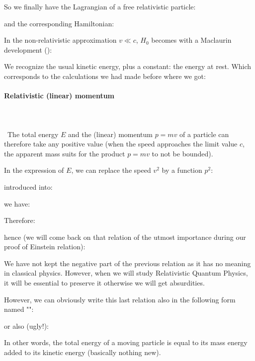 	So we finally have the Lagrangian of a free relativistic particle\label{lagrangian free relativistic particle}:
	
	and the corresponding Hamiltonian:
	
	In the non-relativistic approximation $v\ll c$, $H_0$ becomes with a Maclaurin development ():
	
	We recognize the usual kinetic energy, plus a constant: the energy at rest. Which corresponds to the calculations we had made before where we got:
	

	\paragraph{Relativistic (linear) momentum}\label{relativistic linear momentum}\mbox{}\\\\\
	The total energy $E$ and the (linear) momentum $p=mv$ of a particle can therefore take any positive value (when the speed approaches the limit value $c$, the apparent mass suits for the product $p=mv$ to not be bounded).

	In the expression of $E$, we can replace the speed $v^2$ by a function $p^2$:
	
	introduced into:
	
	we have:
	
	Therefore:
	
	hence (we will come back on that relation of the utmost importance during our proof of Einstein relation):
	
	We have not kept the negative part of the previous relation as it has no meaning in classical physics. However, when we will study Relativistic Quantum Physics, it will be essential to preserve it otherwise we will get absurdities.

	However, we can obviously write this last relation also in the following form named "\label{relativistic mass momentum relation}":
	
	or also (ugly!):
	
	In other words, the total energy of a moving particle is equal to its mass energy added to its kinetic energy (basically nothing new).
	
